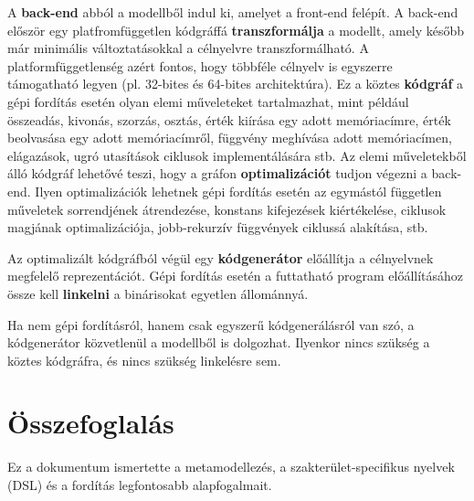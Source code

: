 \documentclass[12pt, a4paper]{report}
\newcommand{\bb}[1]{\textbf{#1}}
\begin{document}
A \bb{back-end} abból a modellből indul ki, amelyet a front-end felépít. A back-end először egy platfromfüggetlen kódgráffá \bb{transzformálja} a modellt, amely később már minimális változtatásokkal a célnyelvre transzformálható. A platformfüggetlenség azért fontos, hogy többféle célnyelv is egyszerre támogatható legyen (pl. 32-bites és 64-bites architektúra). Ez a köztes \bb{kódgráf} a gépi fordítás esetén olyan elemi műveleteket tartalmazhat, mint például összeadás, kivonás, szorzás, osztás, érték kiírása egy adott memóriacímre, érték beolvasása egy adott memóriacímről, függvény meghívása adott memóriacímen, elágazások, ugró utasítások ciklusok implementálására stb. Az elemi műveletekből álló kódgráf lehetővé teszi, hogy a gráfon \bb{optimalizációt} tudjon végezni a back-end. Ilyen optimalizációk lehetnek gépi fordítás esetén az egymástól független műveletek sorrendjének átrendezése, konstans kifejezések kiértékelése, ciklusok magjának optimalizációja, jobb-rekurzív függvények ciklussá alakítása, stb.

Az optimalizált kódgráfból végül egy \bb{kódgenerátor} előállítja a célnyelvnek megfelelő reprezentációt. Gépi fordítás esetén a futtatható program előállításához össze kell \bb{linkelni} a binárisokat egyetlen állománnyá.

Ha nem gépi fordításról, hanem csak egyszerű kódgenerálásról van szó, a kódgenerátor közvetlenül a modellből is dolgozhat. Ilyenkor nincs szükség a köztes kódgráfra, és nincs szükség linkelésre sem.

\chapter{Összefoglalás}

Ez a dokumentum ismertette a metamodellezés, a szakterület-specifikus nyelvek (DSL) és a fordítás legfontosabb alapfogalmait.



\end{document}
